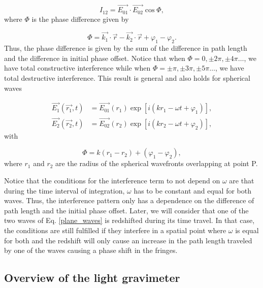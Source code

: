 \documentclass{article}
\begin{document}
\begin{equation}
    I_{12} = \Vec{E_{01}} \cdot \Vec{E_{02}} \cos \Phi,
\end{equation}
%
where $\Phi$ is the phase difference given by

\begin{equation}
\label{phase_difference_eq}
    \Phi = \Vec{k_{1}} \cdot \Vec{r} - \Vec{k_{2}} \cdot \Vec{r} + \varphi_{1} - \varphi_{2}.
\end{equation}
%
Thus, the phase difference is given by the sum of the difference in path length and the difference in initial phase offset. Notice that when $\Phi = 0,\pm 2\pi,\pm4\pi\ldots$, we have total constructive interference while when $\Phi = \pm\pi,\pm 3\pi,\pm 5\pi\ldots$, we have total destructive interference. This result is general and also holds for spherical waves

\begin{equation}
\label{plane_waves_spherical}
    \begin{aligned}
    \Vec{E_{1}}(\Vec{r_{1}}, t) &= \Vec{E_{01}}(r_{1}) \exp [i (kr_{1} - \omega t + \varphi_{1})], \\
    \Vec{E_{2}}(\Vec{r_{2}}, t) &= \Vec{E_{02}}(r_{2}) \exp [i (kr_{2} - \omega t + \varphi_{2})],
    \end{aligned}
\end{equation}
%
with

\begin{equation}
    \Phi = k(r_{1} - r_{2}) + (\varphi_{1} - \varphi_{2}),
\end{equation}
%
where $r_{1}$ and $r_{2}$ are the radius of the spherical wavefronts overlapping at point P.

Notice that the conditions for the interference term to not depend on $\omega$ are that during the time interval of integration, $\omega$ has to be constant and equal for both waves. Thus, the interference pattern only has a dependence on the difference of path length and the initial phase offset. Later, we will consider that one of the two waves of Eq. \ref{plane_waves} is redshifted during its time travel. In that case, the conditions are still fulfilled if they interfere in a spatial point where $\omega$ is equal for both and the redshift will only cause an increase in the path length traveled by one of the waves causing a phase shift in the fringes.

\subsection{Overview of the light gravimeter}
\end{document}
